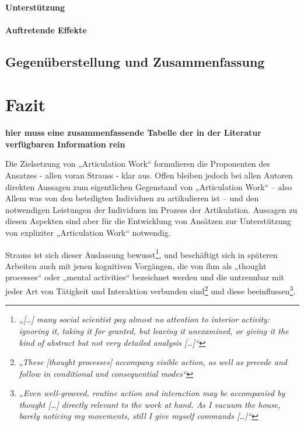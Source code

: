 \paragraph{Unterstützung}

\paragraph{Auftretende Effekte}

\subsection{Gegenüberstellung und Zusammenfassung} %
\label{sub:gegenüberstellung_und_zusammenfassung}



\section{Fazit} %
\label{sec:fazit}

\textbf{hier muss eine zusammenfassende Tabelle der in der Literatur verfügbaren Information rein}

Die Zielsetzung von „Articulation Work“ formulieren die Proponenten des Ansatzes - allen voran Strauss - klar aus. Offen bleiben jedoch bei allen Autoren direkten Aussagen zum eigentlichen Gegenstand von „Articulation Work“ – also Allem was von den beteiligten Individuen zu artikulieren ist – und den notwendigen Leistungen der Individuen im Prozess der Artikulation. Aussagen zu diesen Aspekten sind aber für die Entwicklung von Ansätzen zur Unterstützung von expliziter „Articulation Work“ notwendig. 

Strauss ist sich dieser Auslassung bewusst\footnote{\emph{„[\ldots] many social scientist pay almost no attention to interior activity: ignoring it, taking it for granted, but leaving it unexamined, or giving it the kind of abstract but not very detailed analysis [\ldots]“}\citep[][S. 131]{Strauss93}}, und beschäftigt sich in späteren Arbeiten \citep{Strauss93} auch mit jenen kognitiven Vorgängen, die von ihm als „thought processes“ oder „mental activities“ bezeichnet werden und die untrennbar mit jeder Art von Tätigkeit und Interaktion verbunden sind\footnote{\emph{„These [thought processes] accompany visible action, as well as precede and follow in conditional and consequential modes“}\citep[][S. 146]{Strauss93}} und diese beeinflussen\footnote{\emph{„Even well-grooved, routine action and interaction may be accompanied by thought [\ldots] directly relevant to the work at hand. As I vacuum the house, barely noticing my movements, still I give myself commands [\ldots]“}\citep[][S. 132]{Strauss93}}. 

